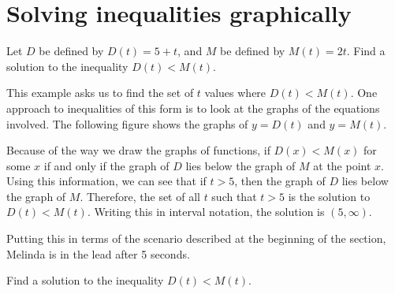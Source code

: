 \documentclass[noauthor, nooutcomes]{ximera}
\begin{document}
\section{Solving inequalities graphically}
\begin{example}
Let $D$ be defined by $D(t) = 5 + t$, and $M$ be defined by $M(t) = 2t$. Find a solution to the inequality $D(t) < M(t)$. 
\end{example}
\begin{explanation}
This example asks us to find the set of $t$ values where $D(t) < M(t)$. One approach to inequalities of this form is to look at the graphs of the equations involved. The following figure shows the graphs of $y = D(t)$ and $y = M(t)$. 

\begin{image}
\end{image}

Because of the way we draw the graphs of functions, if $D(x) < M(x)$ for some $x$ if and only if the graph of $D$ lies below the graph of $M$ at the point $x$. Using this information, we can see that if $t > 5$, then the graph of $D$ lies below the graph of $M$. Therefore, the set of all $t$ such that $t > 5$ is the solution to $D(t) < M(t)$. Writing this in interval notation, the solution is $(5, \infty)$. 

Putting this in terms of the scenario described at the beginning of the section, Melinda is in the lead after 5 seconds. 
\end{explanation}

\begin{exploration}
Find a solution to the inequality $D(t) < M(t)$. 
\end{exploration}
\end{document}

